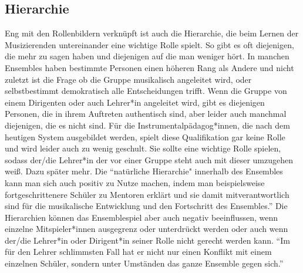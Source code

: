 \subsection{Hierarchie}
Eng mit den Rollenbildern verknüpft ist auch die Hierarchie, die beim Lernen der
Musizierenden untereinander eine wichtige Rolle spielt. So gibt es oft
diejenigen, die mehr zu sagen haben und diejenigen auf die man weniger hört. In
manchen Ensembles haben bestimmte Personen einen höheren Rang als Andere und
nicht zuletzt ist die Frage ob die Gruppe musikalisch angeleitet wird, oder
selbstbestimmt demokratisch alle Entscheidungen trifft. Wenn die Gruppe von
einem Dirigenten oder auch Lehrer*in angeleitet wird, gibt es diejenigen Personen,
die in ihrem Auftreten authentisch sind, aber leider auch manchmal diejenigen,
die es nicht sind. Für die Instrumentalpädagog*innen, die nach dem heutigen System
ausgebildet werden, spielt diese Qualifikation gar keine Rolle und wird leider
auch zu wenig geschult. Sie sollte eine wichtige Rolle spielen, sodass der/die
Lehrer*in der vor einer Gruppe steht auch mit dieser umzugehen weiß. Dazu später
mehr. Die \enquote{natürliche Hierarchie" innerhalb des Ensembles kann man sich auch
positiv zu Nutze machen, indem man beispielsweise fortgeschrittenere Schüler zu
Mentoren erklärt und sie damit mitverantwortlich sind für die musikalische
Entwicklung und den Fortschritt des
Ensembles.}\autocite[95]{doerne:umfassend_musizieren} Die Hierarchien können das
Ensemblespiel aber auch negativ beeinflussen, wenn einzelne Mitspieler*innen
ausgegrenz oder unterdrückt werden oder auch wenn der/die Lehrer*in oder Dirigent*in
seiner Rolle nicht gerecht werden kann. \enquote{Im für den Lehrer schlimmsten Fall hat
er nicht nur einen Konflikt mit einem einzelnen Schüler, sondern unter Umständen
das ganze Ensemble gegen sich.}\autocite[94]{mitzscherlich:musikpsychologie}


